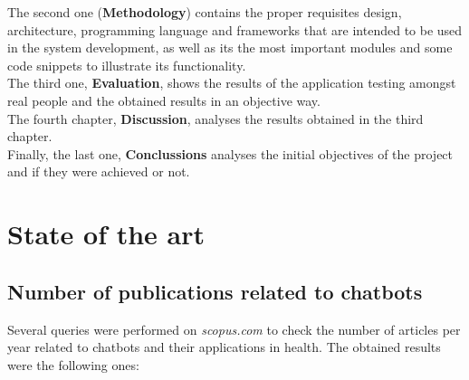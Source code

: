 \documentclass[12pt,english]{article}
\begin{document}
The second one (\textbf{Methodology}) contains the proper requisites design, architecture, programming language and frameworks that are intended to be used in the system development, as well as its the most important modules and some code snippets to illustrate its functionality.\\

The third one, \textbf{Evaluation}, shows the results of the application testing amongst real people and the obtained results in an objective way.\\

The fourth chapter, \textbf{Discussion}, analyses the results obtained in the third chapter.\\

Finally, the last one, \textbf{Conclussions} analyses the initial objectives of the project and if they were achieved or not.



\newpage

\section{State of the art}

\subsection{Number of publications related to chatbots}

Several queries were performed on \textit{scopus.com} to check the number of articles per year related to chatbots and their applications in health. The obtained results were the following ones:
\end{document}
